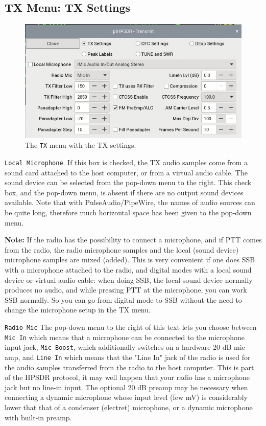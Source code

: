 \documentclass[12pt]{book}
\def\rett#1{\texttt{\color{red}#1}}
\def\bltt#1{\texttt{\color{blue}#1}}
\begin{document}
\subsection{TX Menu: TX Settings}


\label{sec:txmenu}
\begin{figure}[ht!]
\center
\includegraphics[scale=0.45]{TXMenu.png}
\caption{The \bltt{TX} menu with the TX settings.}
\label{fig:TXMenu}
\end{figure}

\rett{Local Microphone}. If this box is checked, the TX audio samples come from a sound card
attached to the host computer, or from a virtual audio cable. The sound device can be
selected from the pop-down menu to the right.
This check box, and the pop-down menu, is absent if
there are no output sound devices available. Note that with PulseAudio/PipeWire, the
names of audio sources can be quite long, therefore much horizontal space has been
given to the pop-down menu.

\textbf{Note:} If the radio has the possibility
to connect a microphone, and if PTT comes from the radio, the radio microphone samples
and the local (sound device) microphone samples are mixed (added). This is very convenient
if one does SSB with a microphone attached to the radio, and digital modes with a
local sound device or virtual audio cable: when doing SSB, the local sound device normally
produces no audio, and while pressing PTT at the microphone, you can work SSB normally.
So you can go from digital mode to SSB without the need to change the microphone setup
in the TX menu.

\rett{Radio Mic} The pop-down menu to the right of this text
lets you choose between \rett{Mic In} which means
that a microphone can be connected to the microphone input jack, \rett{Mic Boost}, which
additionally switches on a hardware 20 dB mic amp, and \rett{Line In} which means that the
"Line In" jack of the radio is used for the audio samples transferred from the radio to the
host computer. This is part of the HPSDR protocol, it may well happen that your radio has a
microphone jack but no line-in input. The optional 20 dB preamp may be necessary when connecting
a dynamic microphone whose input level (few mV) is considerably lower that that of a
condenser (electret) microphone, or a dynamic microphone with built-in preamp.
\end{document}
